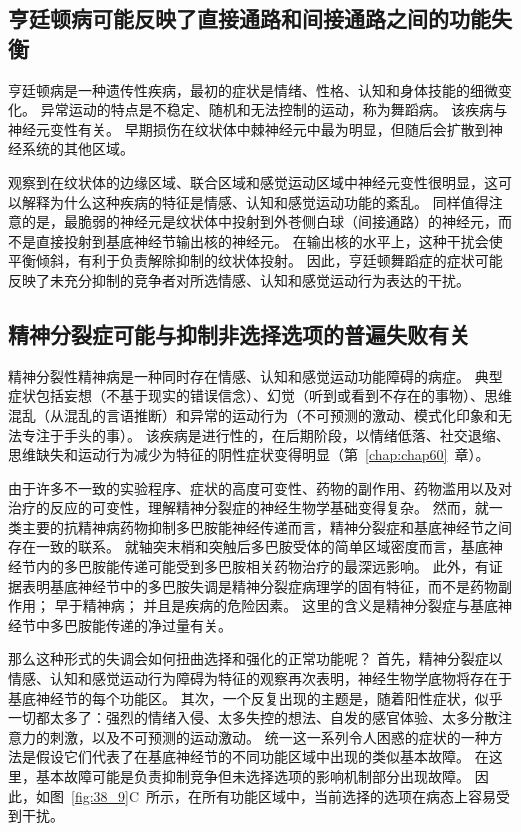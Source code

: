 \subsection{亨廷顿病可能反映了直接通路和间接通路之间的功能失衡}

亨廷顿病是一种遗传性疾病，最初的症状是情绪、性格、认知和身体技能的细微变化。
异常运动的特点是不稳定、随机和无法控制的运动，称为舞蹈病。
该疾病与神经元变性有关。
早期损伤在纹状体中棘神经元中最为明显，但随后会扩散到神经系统的其他区域。


观察到在纹状体的边缘区域、联合区域和感觉运动区域中神经元变性很明显，这可以解释为什么这种疾病的特征是情感、认知和感觉运动功能的紊乱。
同样值得注意的是，最脆弱的神经元是纹状体中投射到外苍侧白球（间接通路）的神经元，而不是直接投射到基底神经节输出核的神经元。
在输出核的水平上，这种干扰会使平衡倾斜，有利于负责解除抑制的纹状体投射。
因此，亨廷顿舞蹈症的症状可能反映了未充分抑制的竞争者对所选情感、认知和感觉运动行为表达的干扰。



\subsection{精神分裂症可能与抑制非选择选项的普遍失败有关}

精神分裂性精神病是一种同时存在情感、认知和感觉运动功能障碍的病症。
典型症状包括妄想（不基于现实的错误信念）、幻觉（听到或看到不存在的事物）、思维混乱（从混乱的言语推断）和异常的运动行为（不可预测的激动、模式化印象和无法专注于手头的事）。
该疾病是进行性的，在后期阶段，以情绪低落、社交退缩、思维缺失和运动行为减少为特征的阴性症状变得明显（第~\ref{chap:chap60}~章）。


由于许多不一致的实验程序、症状的高度可变性、药物的副作用、药物滥用以及对治疗的反应的可变性，理解精神分裂症的神经生物学基础变得复杂。
然而，就一类主要的抗精神病药物抑制多巴胺能神经传递而言，精神分裂症和基底神经节之间存在一致的联系。
就轴突末梢和突触后多巴胺受体的简单区域密度而言，基底神经节内的多巴胺能传递可能受到多巴胺相关药物治疗的最深远影响。
此外，有证据表明基底神经节中的多巴胺失调是精神分裂症病理学的固有特征，而不是药物副作用；
早于精神病；
并且是疾病的危险因素。
这里的含义是精神分裂症与基底神经节中多巴胺能传递的净过量有关。


那么这种形式的失调会如何扭曲选择和强化的正常功能呢？
首先，精神分裂症以情感、认知和感觉运动行为障碍为特征的观察再次表明，神经生物学底物将存在于基底神经节的每个功能区。
其次，一个反复出现的主题是，随着阳性症状，似乎一切都太多了：强烈的情绪入侵、太多失控的想法、自发的感官体验、太多分散注意力的刺激，以及不可预测的运动激动。
统一这一系列令人困惑的症状的一种方法是假设它们代表了在基底神经节的不同功能区域中出现的类似基本故障。
在这里，基本故障可能是负责抑制竞争但未选择选项的影响机制部分出现故障。
因此，如图~\ref{fig:38_9}C~所示，在所有功能区域中，当前选择的选项在病态上容易受到干扰。




